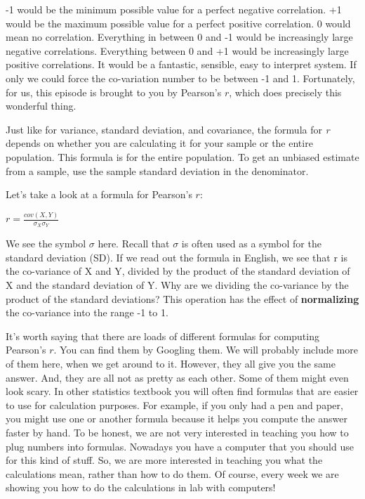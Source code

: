 \documentclass[
]{book}
\begin{document}
-1 would be the minimum possible value for a perfect negative correlation. +1 would be the maximum possible value for a perfect positive correlation. 0 would mean no correlation. Everything in between 0 and -1 would be increasingly large negative correlations. Everything between 0 and +1 would be increasingly large positive correlations. It would be a fantastic, sensible, easy to interpret system. If only we could force the co-variation number to be between -1 and 1. Fortunately, for us, this episode is brought to you by Pearson's \(r\), which does precisely this wonderful thing.

Just like for variance, standard deviation, and covariance, the formula for \emph{r} depends on whether you are calculating it for your sample or the entire population. This formula is for the entire population. To get an unbiased estimate from a sample, use the sample standard deviation in the denominator.

Let's take a look at a formula for Pearson's \(r\):

\(r = \frac{cov(X,Y)}{\sigma_{X}\sigma_{Y}}\)

We see the symbol \(\sigma\) here. Recall that \(\sigma\) is often used as a symbol for the standard deviation (SD). If we read out the formula in English, we see that r is the co-variance of X and Y, divided by the product of the standard deviation of X and the standard deviation of Y. Why are we dividing the co-variance by the product of the standard deviations? This operation has the effect of \textbf{normalizing} the co-variance into the range -1 to 1.

It's worth saying that there are loads of different formulas for computing Pearson's \(r\). You can find them by Googling them. We will probably include more of them here, when we get around to it. However, they all give you the same answer. And, they are all not as pretty as each other. Some of them might even look scary. In other statistics textbook you will often find formulas that are easier to use for calculation purposes. For example, if you only had a pen and paper, you might use one or another formula because it helps you compute the answer faster by hand. To be honest, we are not very interested in teaching you how to plug numbers into formulas. Nowadays you have a computer that you should use for this kind of stuff. So, we are more interested in teaching you what the calculations mean, rather than how to do them. Of course, every week we are showing you how to do the calculations in lab with computers!
\end{document}
